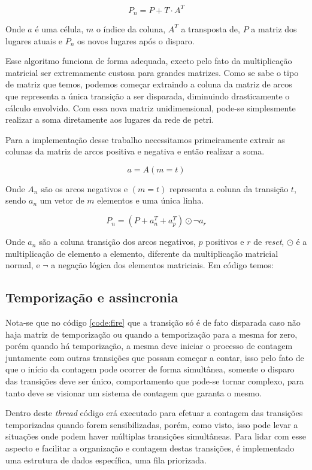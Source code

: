 $$
P_n = P + T \cdot A^T
$$

Onde $a$ é uma célula, $m$ o índice da coluna, $A^T$ a transposta de, $P$ a matriz dos lugares atuais e $P_n$ os novos lugares após o disparo.

Esse algoritmo funciona de forma adequada, exceto pelo fato da multiplicação matricial ser extremamente custosa para grandes matrizes. Como se sabe o tipo de matriz que temos, podemos começar extraindo a coluna da matriz de arcos que representa a única transição a ser disparada, diminuindo drasticamente o cálculo envolvido. Com essa nova matriz unidimensional, pode-se simplesmente realizar a soma diretamente aos lugares da rede de petri. 

Para a implementação desse trabalho necessitamos primeiramente extrair as colunas da matriz de arcos positiva e negativa e então realizar a soma.

$$
a = A(m=t)
$$

Onde $A_n$ são os arcos negativos e $(m=t)$ representa a coluna da transição $t$, sendo $a_n$ um vetor de $m$ elementos e uma única linha.

$$
P_n = \left(P + a_n^T + a_p^T\right) \odot \neg a_r
$$

Onde $a_n$ são a coluna transição dos arcos negativos, $p$ positivos e $r$ de \textit{reset}, $\odot$ é a multiplicação de elemento a elemento, diferente da multiplicação matricial normal, e $\neg$ a negação lógica dos elementos matriciais. Em código temos:



\subsection{Temporização e assincronia}

Nota-se que no código \ref{code:fire} que a transição só é de fato disparada caso não haja matriz de temporização ou quando a temporização para a mesma for zero, porém quando há temporização, a mesma deve iniciar o processo de contagem juntamente com outras transições que possam começar a contar, isso pelo fato de que o início da contagem pode ocorrer de forma simultânea, somente o disparo das transições deve ser único, comportamento que pode-se tornar complexo, para tanto deve se visionar um sistema de contagem que garanta o mesmo.

Dentro deste \textit{thread} código erá executado para efetuar a contagem das transições temporizadas quando forem sensibilizadas, porém, como visto, isso pode levar a situações onde podem haver múltiplas transições simultâneas. Para lidar com esse aspecto e facilitar a organização e contagem destas transições, é implementado uma estrutura de dados específica, uma fila priorizada. 

